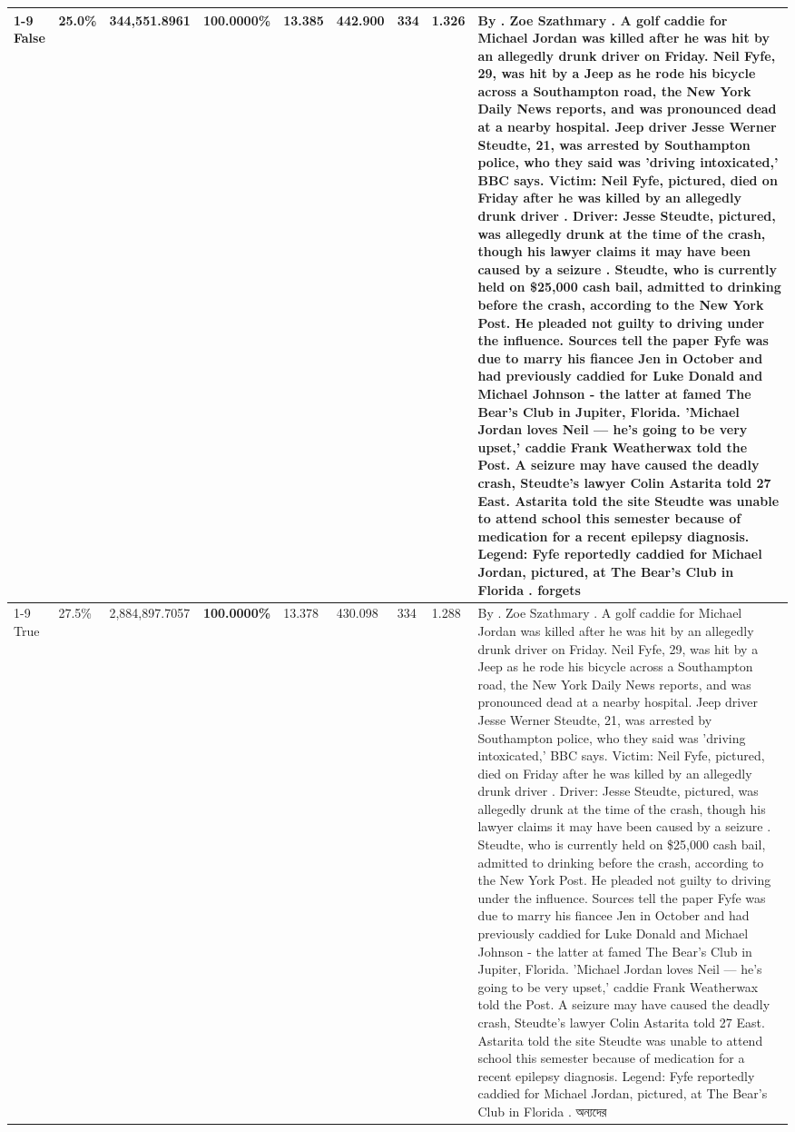 \begin{table}[H]
\begin{tabular}{lllrlllll}
\cline{1-9}
False & 25.0\% & 344,551.8961 & \bfseries \color{red} 100.0000\% & 13.385 & 442.900 & 334 & 1.326 & By . Zoe Szathmary . A golf caddie for Michael Jordan was killed after he was hit by an allegedly drunk driver on Friday. Neil Fyfe, 29, was hit by a Jeep as he rode his bicycle across a Southampton road, the New York Daily News reports, and was pronounced dead at a nearby hospital. Jeep driver Jesse Werner Steudte, 21, was arrested by Southampton police, who they said was 'driving intoxicated,' BBC says. Victim: Neil Fyfe, pictured, died on Friday after he was killed by an allegedly drunk driver . Driver: Jesse Steudte, pictured, was allegedly drunk at the time of the crash, though his lawyer claims it may have been caused by a seizure . Steudte, who is currently held on \$25,000 cash bail, admitted to drinking before the crash, according to the New York Post. He pleaded not guilty to driving under the influence. Sources tell the paper Fyfe was due to marry his fiancee Jen in October and had previously caddied for Luke Donald and Michael Johnson - the latter at famed The Bear's Club in Jupiter, Florida. 'Michael Jordan loves Neil — he’s going to be very upset,' caddie Frank Weatherwax told the Post. A seizure may have caused the deadly crash, Steudte's lawyer Colin Astarita told 27 East. Astarita told the site Steudte was unable to attend school this semester because of medication for a recent epilepsy diagnosis. Legend: Fyfe reportedly caddied for Michael Jordan, pictured, at The Bear's Club in Florida . forgets \\
\cline{1-9}
True & 27.5\% & 2,884,897.7057 & \bfseries \color{red} 100.0000\% & 13.378 & 430.098 & 334 & 1.288 & By . Zoe Szathmary . A golf caddie for Michael Jordan was killed after he was hit by an allegedly drunk driver on Friday. Neil Fyfe, 29, was hit by a Jeep as he rode his bicycle across a Southampton road, the New York Daily News reports, and was pronounced dead at a nearby hospital. Jeep driver Jesse Werner Steudte, 21, was arrested by Southampton police, who they said was 'driving intoxicated,' BBC says. Victim: Neil Fyfe, pictured, died on Friday after he was killed by an allegedly drunk driver . Driver: Jesse Steudte, pictured, was allegedly drunk at the time of the crash, though his lawyer claims it may have been caused by a seizure . Steudte, who is currently held on \$25,000 cash bail, admitted to drinking before the crash, according to the New York Post. He pleaded not guilty to driving under the influence. Sources tell the paper Fyfe was due to marry his fiancee Jen in October and had previously caddied for Luke Donald and Michael Johnson - the latter at famed The Bear's Club in Jupiter, Florida. 'Michael Jordan loves Neil — he’s going to be very upset,' caddie Frank Weatherwax told the Post. A seizure may have caused the deadly crash, Steudte's lawyer Colin Astarita told 27 East. Astarita told the site Steudte was unable to attend school this semester because of medication for a recent epilepsy diagnosis. Legend: Fyfe reportedly caddied for Michael Jordan, pictured, at The Bear's Club in Florida . অন্যদের \\

\end{tabular}
\end{table}
